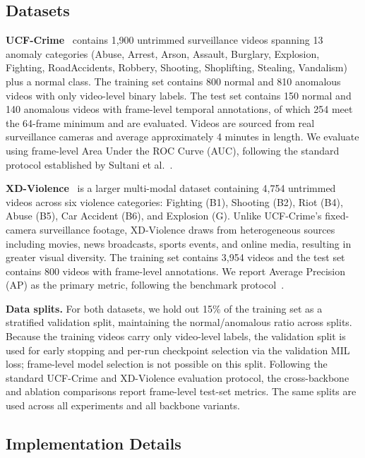 \documentclass[sigconf]{acmart}
\begin{document}
\subsection{Datasets}

\textbf{UCF-Crime}~\cite{sultani2018ucfcrime} contains 1,900 untrimmed surveillance videos spanning 13 anomaly categories (Abuse, Arrest, Arson, Assault, Burglary, Explosion, Fighting, RoadAccidents, Robbery, Shooting, Shoplifting, Stealing, Vandalism) plus a normal class. The training set contains 800 normal and 810 anomalous videos with only video-level binary labels. The test set contains 150 normal and 140 anomalous videos with frame-level temporal annotations, of which 254 meet the 64-frame minimum and are evaluated. Videos are sourced from real surveillance cameras and average approximately 4 minutes in length. We evaluate using frame-level Area Under the ROC Curve (AUC), following the standard protocol established by Sultani et al.~\cite{sultani2018ucfcrime}.

\textbf{XD-Violence}~\cite{wu2020xdviolence} is a larger multi-modal dataset containing 4,754 untrimmed videos across six violence categories: Fighting (B1), Shooting (B2), Riot (B4), Abuse (B5), Car Accident (B6), and Explosion (G). Unlike UCF-Crime's fixed-camera surveillance footage, XD-Violence draws from heterogeneous sources including movies, news broadcasts, sports events, and online media, resulting in greater visual diversity. The training set contains 3,954 videos and the test set contains 800 videos with frame-level annotations. We report Average Precision (AP) as the primary metric, following the benchmark protocol~\cite{wu2020xdviolence}.

\textbf{Data splits.} For both datasets, we hold out 15\% of the training set as a stratified validation split, maintaining the normal/anomalous ratio across splits. Because the training videos carry only video-level labels, the validation split is used for early stopping and per-run checkpoint selection via the validation MIL loss; frame-level model selection is not possible on this split. Following the standard UCF-Crime and XD-Violence evaluation protocol, the cross-backbone and ablation comparisons report frame-level test-set metrics. The same splits are used across all experiments and all backbone variants.

\subsection{Implementation Details}
\label{sec:impl}
\end{document}
